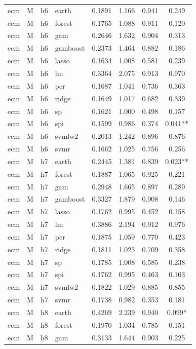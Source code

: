 \begin{ThreePartTable}
\begin{longtable}[t]{llclcccc}
\addlinespace
ecm & M & h6 & earth & 0.1891 & 1.166 & 0.941 & 0.249\\
ecm & M & h6 & forest & 0.1765 & 1.088 & 0.911 & 0.120\\
ecm & M & h6 & gam & 0.2646 & 1.632 & 0.904 & 0.313\\
ecm & M & h6 & gamboost & 0.2373 & 1.464 & 0.882 & 0.186\\
ecm & M & h6 & lasso & 0.1634 & 1.008 & 0.581 & 0.239\\
ecm & M & h6 & lm & 0.3364 & 2.075 & 0.913 & 0.970\\
ecm & M & h6 & pcr & 0.1687 & 1.041 & 0.736 & 0.363\\
ecm & M & h6 & ridge & 0.1649 & 1.017 & 0.682 & 0.339\\
ecm & M & h6 & sp & 0.1621 & 1.000 & 0.498 & 0.157\\
ecm & M & h6 & spi & 0.1599 & 0.986 & 0.374 & 0.041**\\
ecm & M & h6 & svmlw2 & 0.2013 & 1.242 & 0.896 & 0.876\\
ecm & M & h6 & svmr & 0.1662 & 1.025 & 0.756 & 0.256\\
\addlinespace
ecm & M & h7 & earth & 0.2445 & 1.381 & 0.839 & 0.023**\\
ecm & M & h7 & forest & 0.1887 & 1.065 & 0.925 & 0.221\\
ecm & M & h7 & gam & 0.2948 & 1.665 & 0.897 & 0.289\\
ecm & M & h7 & gamboost & 0.3327 & 1.879 & 0.908 & 0.146\\
ecm & M & h7 & lasso & 0.1762 & 0.995 & 0.452 & 0.158\\
ecm & M & h7 & lm & 0.3886 & 2.194 & 0.912 & 0.976\\
ecm & M & h7 & pcr & 0.1875 & 1.059 & 0.770 & 0.423\\
ecm & M & h7 & ridge & 0.1811 & 1.023 & 0.709 & 0.358\\
ecm & M & h7 & sp & 0.1785 & 1.008 & 0.585 & 0.238\\
ecm & M & h7 & spi & 0.1762 & 0.995 & 0.463 & 0.103\\
ecm & M & h7 & svmlw2 & 0.1822 & 1.029 & 0.885 & 0.855\\
ecm & M & h7 & svmr & 0.1738 & 0.982 & 0.353 & 0.181\\
\addlinespace
ecm & M & h8 & earth & 0.4269 & 2.239 & 0.940 & 0.099*\\
ecm & M & h8 & forest & 0.1970 & 1.034 & 0.785 & 0.151\\
ecm & M & h8 & gam & 0.3133 & 1.644 & 0.903 & 0.225\\

\end{longtable}
\end{ThreePartTable}
